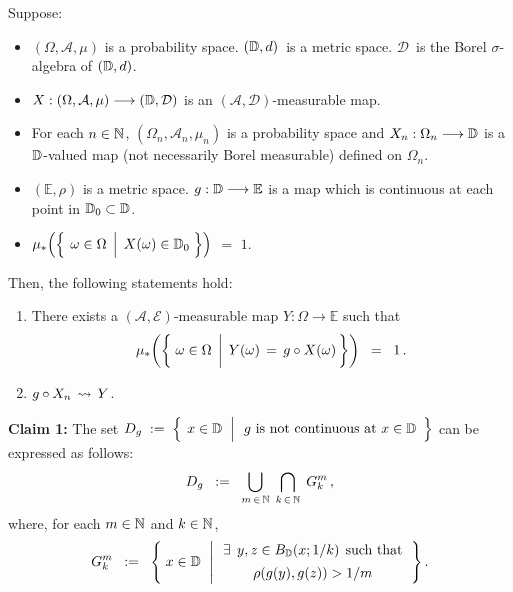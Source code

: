 \begin{theorem}
\mbox{}\vskip 0.1cm
\noindent
Suppose:
\begin{itemize}
\item
	$(\Omega,\mathcal{A},\mu)$ is a probability space.
	$(\mathbb{D},d)$\, is a metric space.
	$\mathcal{D}$\, is the Borel $\sigma$-algebra of $(\mathbb{D},d)$.
\item
	$X : (\Omega,\mathcal{A},\mu) \longrightarrow (\mathbb{D},\mathcal{D})$
	is an $(\mathcal{A},\mathcal{D})$-measurable map.
\item
	For each $n \in \mathbb{N}$,
	$(\Omega_{n},\mathcal{A}_{n},\mu_{n})$ is a probability space and
	$X_{n} : \Omega_{n} \longrightarrow \mathbb{D}$
	is a $\mathbb{D}$-valued map (not necessarily Borel measurable) defined on $\Omega_{n}$.
\item
	$(\mathbb{E},\rho)$ is a metric space.
	$g : \mathbb{D} \longrightarrow \mathbb{E}$ is a map which is continuous at each point in $\mathbb{D}_{0} \subset \mathbb{D}$.
\item
	$\mu_{*}\!\left(\left\{\;\left.\omega\overset{{\color{white}.}}{\in}\Omega\;\,\right\vert\;X(\omega)\in\D_{0}\;\right\}\right)$
	\;$=$\; $1$.
\end{itemize}
Then, the following statements hold:
\begin{enumerate}
\item
	There exists a $(\mathcal{A},\mathcal{E})$-measurable map $Y : \Omega \longrightarrow \mathbb{E}$ such that
	\begin{equation*}
	\mu_{*}\!\left(\left\{\,
		\left.
		\omega \overset{{\color{white}-}}{\in} \Omega
		\;\,\right\vert\;
		Y(\omega) \,=\, g \circ X(\omega)
		\,\right\}\right)
	\;\; = \;\; 1\,.
	\end{equation*}
\item
	$g \circ X_{n} \,\rightsquigarrow\, Y$.
\end{enumerate}
\end{theorem}
\proof

\vskip 0.3cm
\noindent
\textbf{Claim 1:}\;\;
The set\;
$D_{g}
\; := \;
	\left\{\;\left.
		x\overset{{\color{white}.}}{\in}\D
		\;\;\right\vert
		\begin{array}{c}\textnormal{$g$ is not continuous at $x\in\D$}\end{array}
		\right\}$
\;can be expressed as follows:
\begin{equation*}
D_{g}
\;\; := \;\;
	\underset{m\,\in\,\mathbb{N}}{\bigcup}\;\,
	\underset{k\,\in\,\mathbb{N}}{\bigcap}\;\,
	G^{m}_{k}\,,
\end{equation*}
where, for each $m\in\mathbb{N}$ and $k\in\mathbb{N}$,
\begin{equation*}
G^{m}_{k}
\;\; := \;\;
	\left\{\;
		x\overset{{\color{white}.}}{\in}\D
		\;\,\left\vert\,
		\begin{array}{c} \exists \;\,y,z \in B_{\D}(x;1/k) \;\,\textnormal{such that} \\ \rho(g(y),g(z)) \overset{{\color{white}-}}{>} 1/m \end{array}
		\right.
		\right\}.
\end{equation*}

